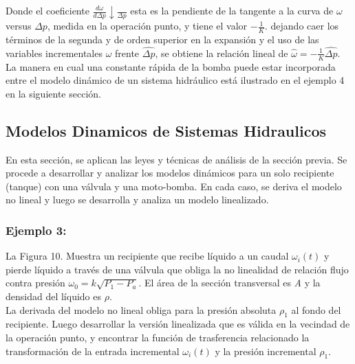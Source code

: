 \documentclass[a4paper,12pt,twoside]{proyectotanquesecci}
\begin{document}
Donde el coeficiente $\frac {d\omega }{d\Delta p} \downarrow \frac {}{\Delta p}$ esta es la pendiente de la tangente a la curva de $\omega$ versus $\Delta p$, medida en la operación punto, y tiene el valor $-\frac{1}{K}$. dejando caer los términos de la segunda y de orden superior en la expansión y el uso de las variables incrementales $\omega$ frente $\widehat{\Delta p}$, se obtiene la relación lineal de $\widehat {\omega}=-\frac {1}{K}\widehat {\Delta p}$. \\
La manera en cual una constante rápida de la bomba puede estar incorporada entre el modelo dinámico de un sistema hidráulico está ilustrado en el ejemplo 4 en la siguiente sección. \\

\subsection{Modelos Dinamicos de Sistemas Hidraulicos}

En esta sección, se aplican las leyes y técnicas de análisis de la sección previa. Se procede a desarrollar y analizar los modelos dinámicos para un solo recipiente (tanque) con una válvula y una moto-bomba. En cada caso, se deriva el modelo no lineal y luego se desarrolla y analiza un modelo linealizado. \\

\subsubsection{Ejemplo 3:}

La Figura 10. Muestra un recipiente que recibe líquido a un caudal $\omega_{i}\left(t\right)$ y pierde  líquido a través de una válvula que obliga la no linealidad de relación flujo contra presión $\omega _{0}=k\sqrt {P_{1}-P_{a}}$. El área de la sección transversal es \textit{A} y la densidad del líquido es $\rho$. \\

La derivada del modelo no lineal obliga para la presión absoluta $\rho_{1}$ al fondo del recipiente. Luego desarrollar la versión linealizada que es válida en la vecindad de la operación punto, y encontrar la función de trasferencia relacionado la transformación de la entrada incremental $\omega_{i}\left(t\right)$ y la presión incremental $\rho_{1}$.
\end{document}
